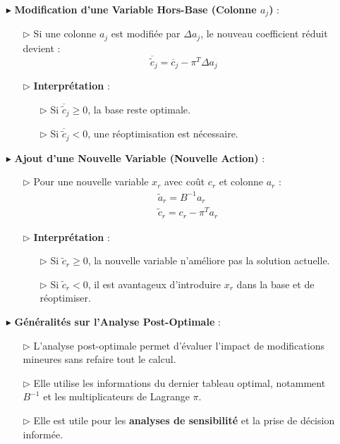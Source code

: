 \documentclass{report}
\begin{document}
\begin{multicols*}{2}
\begin{itemize}
    \item[$\blacktriangleright$] \textbf{Modification d'une Variable Hors-Base (Colonne \( a_j \))} :
    \begin{itemize}
        \item[$\rhd$] Si une colonne \( a_j \) est modifiée par \( \Delta a_j \), le nouveau coefficient réduit devient :
        \[
        \boxed{\overline{\tilde{c}}_j = \overline{c}_j - \pi^T \Delta a_j}
        \]
        \item[$\rhd$] \textbf{Interprétation} :
        \begin{itemize}
            \item[$\rhd$] Si \( \overline{\tilde{c}}_j \geq 0 \), la base reste optimale.
            \item[$\rhd$] Si \( \overline{\tilde{c}}_j < 0 \), une réoptimisation est nécessaire.
        \end{itemize}
    \end{itemize}

    \item[$\blacktriangleright$] \textbf{Ajout d'une Nouvelle Variable (Nouvelle Action)} :
    \begin{itemize}
        \item[$\rhd$] Pour une nouvelle variable \( x_r \) avec coût \( c_r \) et colonne \( a_r \) :
        \begin{align*}
            &\boxed{\tilde{a}_r = B^{-1} a_r} \\
            &\boxed{\tilde{c}_r = c_r - \pi^T a_r}
        \end{align*}
        \item[$\rhd$] \textbf{Interprétation} :
        \begin{itemize}
            \item[$\rhd$] Si \( \tilde{c}_r \geq 0 \), la nouvelle variable n'améliore pas la solution actuelle.
            \item[$\rhd$] Si \( \tilde{c}_r < 0 \), il est avantageux d'introduire \( x_r \) dans la base et de réoptimiser.
        \end{itemize}
    \end{itemize}

    \item[$\blacktriangleright$] \textbf{Généralités sur l'Analyse Post-Optimale} :
    \begin{itemize}
        \item[$\rhd$] L'analyse post-optimale permet d'évaluer l'impact de modifications mineures sans refaire tout le calcul.
        \item[$\rhd$] Elle utilise les informations du dernier tableau optimal, notamment \( B^{-1} \) et les multiplicateurs de Lagrange \( \pi \).
        \item[$\rhd$] Elle est utile pour les \textbf{analyses de sensibilité} et la prise de décision informée.
    \end{itemize}
\end{itemize}
\end{multicols*}
\end{document}
